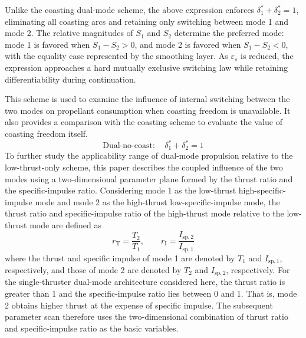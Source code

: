 \documentclass{IEEEtaes}
\begin{document}
Unlike the coasting dual-mode scheme, the above expression enforces $\delta_1^{*}+\delta_2^{*}=1$, eliminating all coasting arcs and retaining only switching between mode 1 and mode 2. The relative magnitudes of $S_1$ and $S_2$ determine the preferred mode: mode 1 is favored when $S_1-S_2>0$, and mode 2 is favored when $S_1-S_2<0$, with the equality case represented by the smoothing layer. As $\varepsilon_s$ is reduced, the expression approaches a hard mutually exclusive switching law while retaining differentiability during continuation.

This scheme is used to examine the influence of internal switching between the two modes on propellant consumption when coasting freedom is unavailable. It also provides a comparison with the coasting scheme to evaluate the value of coasting freedom itself.
\begin{equation}
\text{Dual-no-coast}:\quad \delta_1^{*}+\delta_2^{*}=1
\end{equation}
To further study the applicability range of dual-mode propulsion relative to the low-thrust-only scheme, this paper describes the coupled influence of the two modes using a two-dimensional parameter plane formed by the thrust ratio and the specific-impulse ratio. Considering mode 1 as the low-thrust high-specific-impulse mode and mode 2 as the high-thrust low-specific-impulse mode, the thrust ratio and specific-impulse ratio of the high-thrust mode relative to the low-thrust mode are defined as
\begin{equation}
r_{\mathrm{T}}=\frac{T_2}{T_1},\qquad r_{\mathrm{I}}=\frac{I_{\mathrm{sp},2}}{I_{\mathrm{sp},1}}
\end{equation}
where the thrust and specific impulse of mode 1 are denoted by $T_1$ and $I_{\mathrm{sp},1}$, respectively, and those of mode 2 are denoted by $T_2$ and $I_{\mathrm{sp},2}$, respectively. For the single-thruster dual-mode architecture considered here, the thrust ratio is greater than 1 and the specific-impulse ratio lies between 0 and 1. That is, mode 2 obtains higher thrust at the expense of specific impulse. The subsequent parameter scan therefore uses the two-dimensional combination of thrust ratio and specific-impulse ratio as the basic variables.
\end{document}
